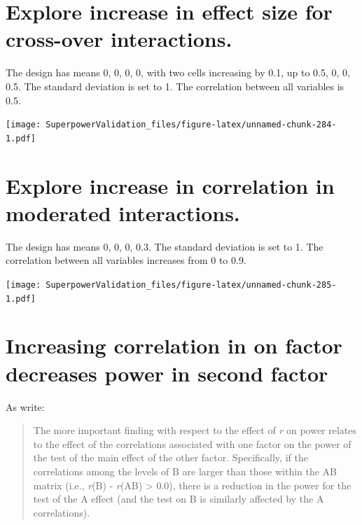 \documentclass[
]{book}
\begin{document}
\pagebreak

\hypertarget{explore-increase-in-effect-size-for-cross-over-interactions.}{%
\section{Explore increase in effect size for cross-over interactions.}\label{explore-increase-in-effect-size-for-cross-over-interactions.}}

The design has means 0, 0, 0, 0, with two cells increasing by 0.1, up to 0.5, 0, 0, 0.5. The standard deviation is set to 1. The correlation between all variables is 0.5.

\texttt{[image: SuperpowerValidation\_files/figure-latex/unnamed-chunk-284-1.pdf]}
\pagebreak

\hypertarget{explore-increase-in-correlation-in-moderated-interactions.}{%
\section{Explore increase in correlation in moderated interactions.}\label{explore-increase-in-correlation-in-moderated-interactions.}}

The design has means 0, 0, 0, 0.3. The standard deviation is set to 1. The correlation between all variables increases from 0 to 0.9.

\texttt{[image: SuperpowerValidation\_files/figure-latex/unnamed-chunk-285-1.pdf]}
\pagebreak

\hypertarget{increasing-correlation-in-on-factor-decreases-power-in-second-factor}{%
\section{Increasing correlation in on factor decreases power in second factor}\label{increasing-correlation-in-on-factor-decreases-power-in-second-factor}}

As \citet{potvin2000statistical} write:

\begin{quote}
The more important finding with respect to the effect of \emph{r} on power relates to the effect of the correlations associated with one factor on the power of the test of the main effect of the other factor. Specifically, if the correlations among the levels of B are larger than those within the AB matrix (i.e., \emph{r}(B) - \emph{r}(AB) \textgreater{} 0.0), there is a reduction in the power for the test of the A effect (and the test on B is similarly affected by the A correlations).
\end{quote}
\end{document}
